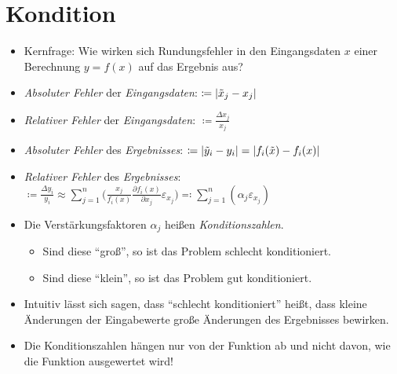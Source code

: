     \section{Kondition} %
        \begin{itemize}
        	\item Kernfrage: Wie wirken sich Rundungsfehler in den Eingangsdaten \( x \) einer Berechnung \( y = f(x) \) auf das Ergebnis aus?
        	\item \textit{Absoluter Fehler} der \textit{Eingangsdaten}: \tabto{6.5cm} \phantom{XXX} \(\coloneqq \abs{\tilde{x} _ j - x _ j} \)
        	\item \textit{Relativer Fehler} der \textit{Eingangsdaten}: \tabto{6.5cm} \phantom{XXX} \( \coloneqq \frac{\Delta x _ j}{x _ j} \)
        	\item \textit{Absoluter Fehler} des \textit{Ergebnisses}: \tabto{6.5cm} \phantom{XXX} \( \coloneqq \abs{\tilde{y} _ i - y _ i} = \abs{f _ i (\tilde{x}) - f _ i (x)} \)
        	\item \textit{Relativer Fehler} des \textit{Ergebnisses}: \tabto{6.5cm} \phantom{XXX} \( \coloneqq \frac{\Delta y _ i}{y _ i} \approx \sum_{j = 1}^{n} \bigg( \frac{x _ j}{f _ i (x)} \frac{\partial f _ i (x)}{\partial x _ j} \varepsilon _ { x _ j } \bigg) \eqqcolon \sum_{j = 1}^{n} ( \alpha _ j \varepsilon _ { x _ j } ) \)
        	\item Die Verstärkungsfaktoren \( \alpha _ j \) heißen \textit{Konditionszahlen}.
	        	\begin{itemize}
	        		\item Sind diese \enquote{groß}, so ist das Problem schlecht konditioniert.
	        		\item Sind diese \enquote{klein}, so ist das Problem gut konditioniert.
	        	\end{itemize}
	        \item Intuitiv lässt sich sagen, dass \enquote{schlecht konditioniert} heißt, dass kleine Änderungen der Eingabewerte große Änderungen des Ergebnisses bewirken.
	        \item Die Konditionszahlen hängen nur von der Funktion ab und nicht davon, wie die Funktion ausgewertet wird!
        \end{itemize}


